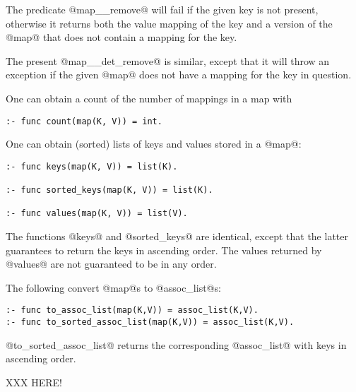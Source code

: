 The predicate @map__remove@ will fail if the given key is not present,
otherwise it returns both the value mapping of the key and a version of
the @map@ that does not contain a mapping for the key.

The present @map__det_remove@ is similar, except that it will throw an
exception if the given @map@ does not have a mapping for the key in
question.

One can obtain a count of the number of mappings in a map with
\begin{verbatim}
:- func count(map(K, V)) = int.
\end{verbatim}

One can obtain (sorted) lists of keys and values stored in a @map@:
\begin{verbatim}
:- func keys(map(K, V)) = list(K).

:- func sorted_keys(map(K, V)) = list(K).

:- func values(map(K, V)) = list(V).
\end{verbatim}
The functions @keys@ and @sorted_keys@ are identical, except that the
latter guarantees to return the keys in ascending order.  The values
returned by @values@ are not guaranteed to be in any order.

The following convert @map@s to @assoc_list@s:
\begin{verbatim}
:- func to_assoc_list(map(K,V)) = assoc_list(K,V).
:- func to_sorted_assoc_list(map(K,V)) = assoc_list(K,V).
\end{verbatim}
@to_sorted_assoc_list@ returns the corresponding @assoc_list@ with keys
in ascending order.

XXX HERE!
